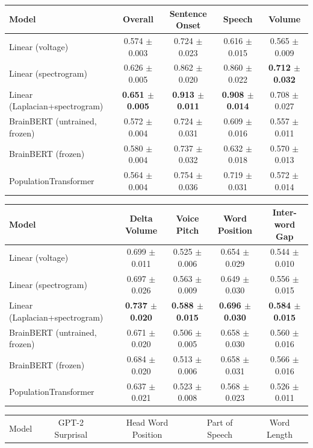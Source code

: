\begin{table}[h]
\centering
\begin{tabular}{lcccc}
\hline
Model & Overall & Sentence Onset & Speech & Volume \\
\hline
Linear (voltage) & 0.574 $\pm$ 0.003 & 0.724 $\pm$ 0.023 & 0.616 $\pm$ 0.015 & 0.565 $\pm$ 0.009 \\
Linear (spectrogram) & 0.626 $\pm$ 0.005 & 0.862 $\pm$ 0.020 & 0.860 $\pm$ 0.022 & \textbf{0.712 $\pm$ 0.032} \\
Linear (Laplacian+spectrogram) & \textbf{0.651 $\pm$ 0.005} & \textbf{0.913 $\pm$ 0.011} & \textbf{0.908 $\pm$ 0.014} & 0.708 $\pm$ 0.027 \\
BrainBERT (untrained, frozen) & 0.572 $\pm$ 0.004 & 0.724 $\pm$ 0.031 & 0.609 $\pm$ 0.016 & 0.557 $\pm$ 0.011 \\
BrainBERT (frozen) & 0.580 $\pm$ 0.004 & 0.737 $\pm$ 0.032 & 0.632 $\pm$ 0.018 & 0.570 $\pm$ 0.013 \\
PopulationTransformer & 0.564 $\pm$ 0.004 & 0.754 $\pm$ 0.036 & 0.719 $\pm$ 0.031 & 0.572 $\pm$ 0.014 \\
\hline
\end{tabular}
\hspace{1em}
\begin{tabular}{lcccc}
\hline
Model & Delta Volume & Voice Pitch & Word Position & Inter-word Gap \\
\hline
Linear (voltage) & 0.699 $\pm$ 0.011 & 0.525 $\pm$ 0.006 & 0.654 $\pm$ 0.029 & 0.544 $\pm$ 0.010 \\
Linear (spectrogram) & 0.697 $\pm$ 0.026 & 0.563 $\pm$ 0.009 & 0.649 $\pm$ 0.030 & 0.556 $\pm$ 0.015 \\
Linear (Laplacian+spectrogram) & \textbf{0.737 $\pm$ 0.020} & \textbf{0.588 $\pm$ 0.015} & \textbf{0.696 $\pm$ 0.030} & \textbf{0.584 $\pm$ 0.015} \\
BrainBERT (untrained, frozen) & 0.671 $\pm$ 0.020 & 0.506 $\pm$ 0.005 & 0.658 $\pm$ 0.030 & 0.560 $\pm$ 0.016 \\
BrainBERT (frozen) & 0.684 $\pm$ 0.020 & 0.513 $\pm$ 0.006 & 0.658 $\pm$ 0.031 & 0.566 $\pm$ 0.016 \\
PopulationTransformer & 0.637 $\pm$ 0.021 & 0.523 $\pm$ 0.008 & 0.568 $\pm$ 0.023 & 0.526 $\pm$ 0.011 \\
\hline
\end{tabular}
\hspace{1em}
\begin{tabular}{lcccc}
\hline
Model & GPT-2 Surprisal & Head Word Position & Part of Speech & Word Length \\

\end{tabular}
\end{table}
